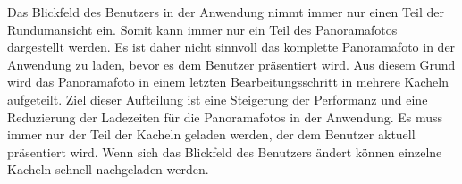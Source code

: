 Das Blickfeld des Benutzers in der Anwendung nimmt immer nur einen Teil der
Rundumansicht ein. Somit kann immer nur ein Teil des Panoramafotos
dargestellt werden. Es ist daher nicht sinnvoll das komplette Panoramafoto in
der Anwendung zu laden, bevor es dem Benutzer präsentiert wird.
Aus diesem Grund wird das Panoramafoto in einem letzten Bearbeitungsschritt in
mehrere Kacheln aufgeteilt. Ziel dieser Aufteilung ist eine Steigerung der
Performanz und eine Reduzierung der Ladezeiten für die Panoramafotos in der
Anwendung. Es muss immer nur der Teil der Kacheln geladen werden, der dem
Benutzer aktuell präsentiert wird. Wenn sich das Blickfeld des Benutzers ändert
können einzelne Kacheln schnell nachgeladen werden.